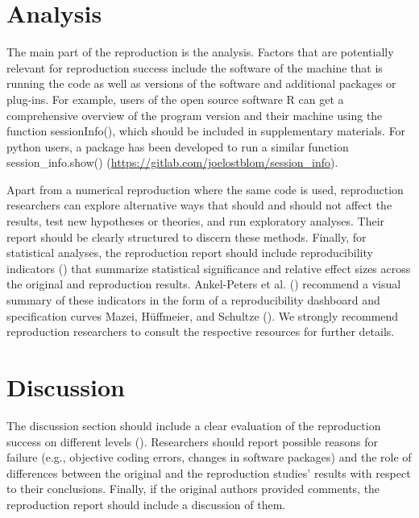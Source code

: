 \documentclass[
  letterpaper,
  DIV=11,
  openany,
  fontsize=12pt,
  parskip=half,
  headings=big,
  numbers=noenddot,
  titlepage=false]{scrreprt}
\begin{document}
\section{Analysis}\label{analysis}

The main part of the reproduction is the analysis. Factors that are
potentially relevant for reproduction success include the software of
the machine that is running the code as well as versions of the software
and additional packages or plug-ins. For example, users of the open
source software R can get a comprehensive overview of the program
version and their machine using the function sessionInfo(), which should
be included in supplementary materials. For python users, a package has
been developed to run a similar function session\_info.show()
(\url{https://gitlab.com/joelostblom/session_info}).

Apart from a numerical reproduction where the same code is used,
reproduction researchers can explore alternative ways that should and
should not affect the results, test new hypotheses or theories, and run
exploratory analyses. Their report should be clearly structured to
discern these methods. Finally, for statistical analyses, the
reproduction report should include reproducibility indicators
() that
summarize statistical significance and relative effect sizes across the
original and reproduction results. Ankel-Peters et al.
() recommend a visual summary of
these indicators in the form of a reproducibility dashboard and
specification curves Mazei, Hüffmeier, and Schultze
(). We strongly recommend reproduction
researchers to consult the respective resources for further details.

\section{Discussion}\label{discussion}

The discussion section should include a clear evaluation of the
reproduction success on different levels
().
Researchers should report possible reasons for failure (e.g., objective
coding errors, changes in software packages) and the role of differences
between the original and the reproduction studies' results with respect
to their conclusions. Finally, if the original authors provided
comments, the reproduction report should include a discussion of them.
\end{document}
